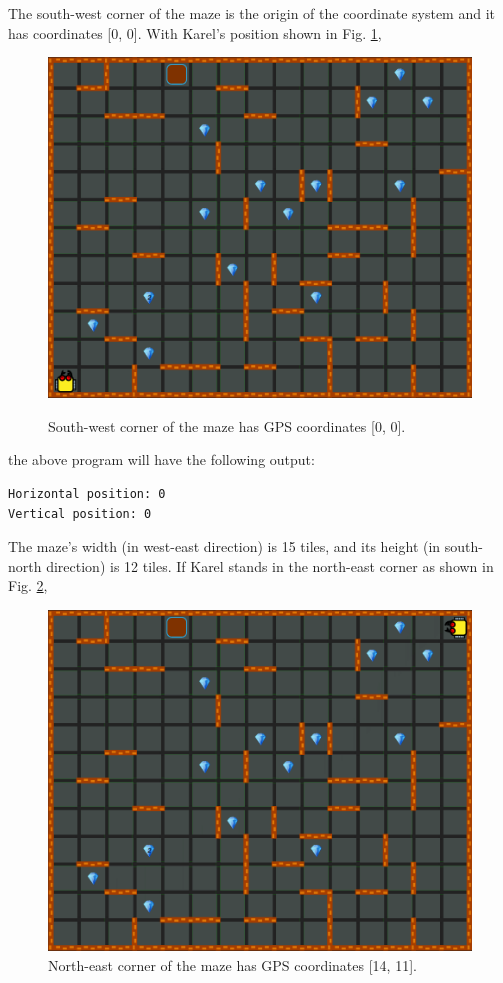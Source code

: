 \noindent
The south-west corner of the maze is the origin of the coordinate system and it has 
coordinates [0, 0]. With Karel's position shown in Fig. \ref{fig:gps-100},

\begin{figure}[!ht]
\begin{center}
\includegraphics[height=0.4\textwidth]{img/gps-100.png}
\vspace{-0mm}
\caption{South-west corner of the maze has GPS coordinates [0, 0].}
\vspace{-6mm}
\label{fig:gps-100}
\end{center}
\end{figure}
\noindent
the above program will have the following output:\\

\begin{ybox}
\begin{verbatim}
Horizontal position: 0
Vertical position: 0
\end{verbatim}
\end{ybox}
\vspace{6mm}

\noindent
The maze's width (in west-east direction) is 15 tiles, and its height (in south-north direction) 
is 12 tiles. If Karel stands in the north-east corner as shown in Fig. \ref{fig:gps-101},

\begin{figure}[!ht]
\begin{center}
\includegraphics[height=0.4\textwidth]{img/gps-101.png}
\vspace{-0mm}
\caption{North-east corner of the maze has GPS coordinates [14, 11].}
\label{fig:gps-101}
\end{center}
\end{figure}

